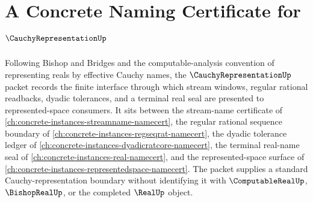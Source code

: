 \chapter{A Concrete Naming Certificate for $\CauchyRepresentationUp$}
\label{ch:concrete-instances-cauchy-representation-namecert}

Following Bishop and Bridges and the computable-analysis convention of representing reals by effective Cauchy names, the $\CauchyRepresentationUp$ packet records the finite interface through which stream windows, regular rational readbacks, dyadic tolerances, and a terminal real seal are presented to represented-space consumers. It sits between the stream-name certificate of \autoref{ch:concrete-instances-streamname-namecert}, the regular rational sequence boundary of \autoref{ch:concrete-instances-regseqrat-namecert}, the dyadic tolerance ledger of \autoref{ch:concrete-instances-dyadicratcore-namecert}, the terminal real-name seal of \autoref{ch:concrete-instances-real-namecert}, and the represented-space surface of \autoref{ch:concrete-instances-representedspace-namecert}. The packet supplies a standard Cauchy-representation boundary without identifying it with $\ComputableRealUp$, $\BishopRealUp$, or the completed $\RealUp$ object.

